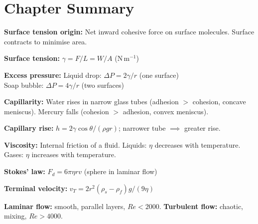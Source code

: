 \section{Chapter Summary}

\begin{summarybox}
\textbf{Surface tension origin:} Net inward cohesive
force on surface molecules. Surface contracts to
minimise area.

\textbf{Surface tension:}
$\gamma = F/L = W/A$ (N\,m$^{-1}$)

\textbf{Excess pressure:}
Liquid drop: $\Delta P = 2\gamma/r$
(one surface)\\
Soap bubble: $\Delta P = 4\gamma/r$
(two surfaces)

\textbf{Capillarity:} Water rises in narrow glass
tubes (adhesion $>$ cohesion, concave meniscus).
Mercury falls (cohesion $>$ adhesion, convex meniscus).

\textbf{Capillary rise:}
$h = 2\gamma\cos\theta/(\rho g r)$;
narrower tube $\implies$ greater rise.

\textbf{Viscosity:} Internal friction of a fluid.
Liquids: $\eta$ decreases with temperature.
Gases: $\eta$ increases with temperature.

\textbf{Stokes' law:} $F_d = 6\pi\eta rv$
(sphere in laminar flow)

\textbf{Terminal velocity:}
$v_T = 2r^2(\rho_s-\rho_f)g/(9\eta)$

\textbf{Laminar flow:} smooth, parallel layers,
$Re < 2000$.
\textbf{Turbulent flow:} chaotic, mixing,
$Re > 4000$.
\end{summarybox}

